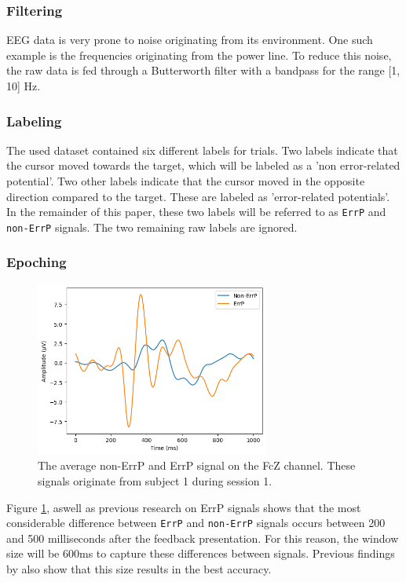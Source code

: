 \subsubsection{Filtering}

EEG data is very prone to noise originating from its environment. One such example is the frequencies originating from the power line. To reduce this noise, the raw data is fed through a Butterworth filter with a bandpass for the range [1, 10] Hz.

\subsubsection{Labeling}

The used dataset contained six different labels for trials. Two labels indicate that the cursor moved towards the target, which will be labeled as a 'non error-related potential'. Two other labels indicate that the cursor moved in the opposite direction compared to the target. These are labeled as 'error-related potentials'. In the remainder of this paper, these two labels will be referred to as \verb|ErrP| and \verb|non-ErrP| signals. The two remaining raw labels are ignored.

\subsubsection{Epoching}

\begin{figure}[!tbp]
    \centering
        \includegraphics[width=7.7cm]{img/FcZs1s1-1000ms.png}
    \caption{The average non-ErrP and ErrP signal on the FcZ channel. These signals originate from subject 1 during session 1.}
    \label{fig:FcZ}
\end{figure}

Figure \ref{fig:FcZ}, aswell as previous research on ErrP signals \citep{lopes2021online, omedes2015analysis} shows that the most considerable difference between \verb|ErrP| and \verb|non-ErrP| signals occurs between 200 and 500 milliseconds after the feedback presentation. For this reason, the window size will be 600ms to capture these differences between signals. Previous findings by \cite{correia2021error} also show that this size results in the best accuracy.

